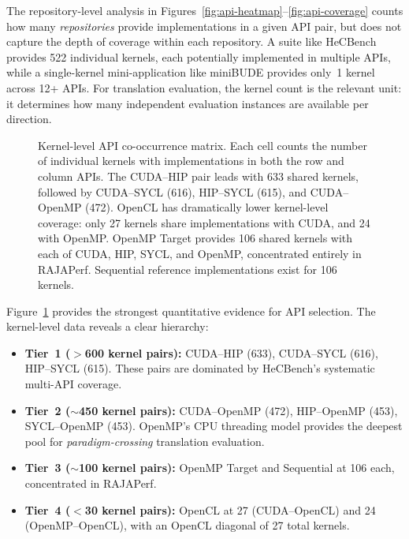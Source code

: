 The repository-level analysis in Figures~\ref{fig:api-heatmap}--\ref{fig:api-coverage} counts how many \emph{repositories} provide implementations in a given API pair, but does not capture the depth of coverage within each repository. A suite like HeCBench provides 522 individual kernels, each potentially implemented in multiple APIs, while a single-kernel mini-application like miniBUDE provides only~1 kernel across 12+ APIs. For translation evaluation, the kernel count is the relevant unit: it determines how many independent evaluation instances are available per direction.

\begin{figure}[htbp]
    \centering
    \caption{Kernel-level API co-occurrence matrix. Each cell counts the number of individual kernels with implementations in both the row and column APIs. The CUDA--HIP pair leads with 633 shared kernels, followed by CUDA--SYCL (616), HIP--SYCL (615), and CUDA--OpenMP (472). OpenCL has dramatically lower kernel-level coverage: only 27 kernels share implementations with CUDA, and 24 with OpenMP. OpenMP Target provides 106 shared kernels with each of CUDA, HIP, SYCL, and OpenMP, concentrated entirely in RAJAPerf. Sequential reference implementations exist for 106 kernels.}
    \label{fig:kernel-cooccurrence}
\end{figure}

Figure~\ref{fig:kernel-cooccurrence} provides the strongest quantitative evidence for API selection. The kernel-level data reveals a clear hierarchy:

\begin{itemize}
    \item \textbf{Tier~1 ($>$600 kernel pairs):} CUDA--HIP (633), CUDA--SYCL (616), HIP--SYCL (615). These pairs are dominated by HeCBench's systematic multi-API coverage.
    \item \textbf{Tier~2 (${\sim}$450 kernel pairs):} CUDA--OpenMP (472), HIP--OpenMP (453), SYCL--OpenMP (453). OpenMP's CPU threading model provides the deepest pool for \emph{paradigm-crossing} translation evaluation.
    \item \textbf{Tier~3 (${\sim}$100 kernel pairs):} OpenMP Target and Sequential at 106 each, concentrated in RAJAPerf.
    \item \textbf{Tier~4 ($<$30 kernel pairs):} OpenCL at 27 (CUDA--OpenCL) and 24 (OpenMP--OpenCL), with an OpenCL diagonal of 27 total kernels.
\end{itemize}

